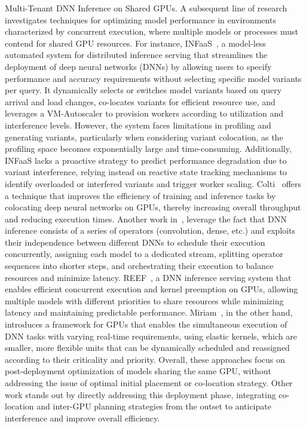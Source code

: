 Multi-Tenant DNN Inference on Shared GPUs.
A subsequent line of research investigates techniques for optimizing model performance in environments characterized by concurrent execution, where multiple models or processes must contend for shared GPU resources. For instance, INFaaS~\cite{francisco2021infaas}, a model-less automated system for distributed inference serving that streamlines the deployment of deep neural networks (DNNs) by allowing users to specify performance and accuracy requirements without selecting specific model variants per query. It dynamically selects or switches model variants based on query arrival and load changes, co-locates variants for efficient resource use, and leverages a VM-Autoscaler to provision workers according to utilization and interference levels. However, the system faces limitations in profiling and generating variants, particularly when considering variant colocation, as the profiling space becomes exponentially large and time-consuming. Additionally, INFaaS lacks a proactive strategy to predict performance degradation due to variant interference, relying instead on reactive state tracking mechanisms to identify overloaded or interfered variants and trigger worker scaling.
Colti~\cite{mobin2023colti} offers a technique that improves the efficiency of training and inference tasks by colocating deep neural networks on GPUs, thereby increasing overall throughput and reducing execution times.
Another work in~\cite{yu2021automated}, leverage the fact that DNN inference consists of a series of operators (convolution, dense, etc.) and exploits their independence between different DNNs to schedule their execution concurrently, assigning each model to a dedicated stream, splitting operator sequences into shorter steps, and orchestrating their execution to balance resources and minimize latency.
REEF~\cite{han2022microsecond}, a DNN inference serving system that enables efficient concurrent execution and kernel preemption on GPUs, allowing multiple models with different priorities to share resources while minimizing latency and maintaining predictable performance.
Miriam~\cite{zhao2023miriam}, in the other hand, introduces a framework for GPUs that enables the simultaneous execution of DNN tasks with varying real-time requirements, using elastic kernels, which are smaller, more flexible units that can be dynamically scheduled and reassigned according to their criticality and priority. Overall, these approaches focus on post-deployment optimization of models sharing the same GPU, without addressing the issue of optimal initial placement or co-location strategy. Other work stands out by directly addressing this deployment phase, integrating co-location and inter-GPU planning strategies from the outset to anticipate interference and improve overall efficiency.




